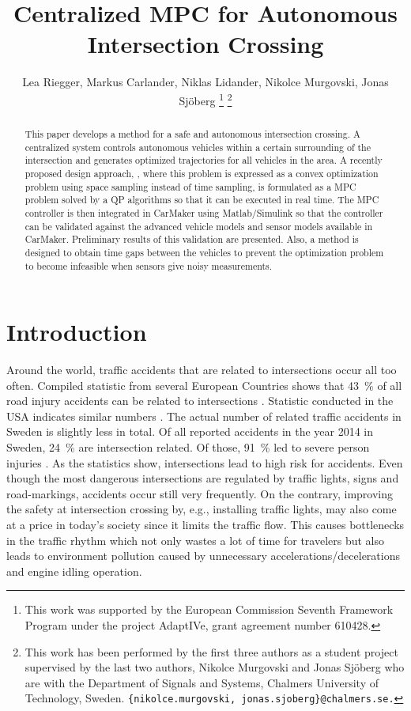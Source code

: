 \documentclass[letterpaper,10pt,conference]{ieeeconf}
\author{Lea Riegger, Markus Carlander, Niklas Lidander, Nikolce Murgovski, Jonas Sj\"oberg
\thanks{This work was supported by the European Commission Seventh Framework
Program under the project AdaptIVe, grant agreement number 610428.}
\thanks{This work has been performed by the first three authors as a
  student project supervised by the last two authors, Nikolce Murgovski
  and Jonas Sj\"oberg who are with the Department of Signals and Systems, Chalmers University of Technology, Sweden. {\tt \{nikolce.murgovski, jonas.sjoberg\}@chalmers.se.}}}%
\begin{document}
\title{Centralized MPC for Autonomous Intersection Crossing}

\maketitle
\thispagestyle{empty}
\pagestyle{empty}

\begin{abstract}
This paper develops a method for a safe and autonomous intersection
crossing. A centralized system controls autonomous vehicles within a
certain surrounding of the intersection and generates optimized
trajectories for all vehicles in the area. A recently proposed design
approach, \cite{nikolce},
where this problem is expressed as a convex optimization problem using
space sampling instead of time sampling, is formulated as a MPC
problem solved by a QP algorithms so that it can be executed in real time.
The MPC controller is then integrated in CarMaker using
Matlab/Simulink so that the controller can be validated against the
advanced vehicle models and sensor models available in
CarMaker. Preliminary results of this validation are presented. Also, a
method is designed to obtain time gaps between the vehicles to prevent the
optimization problem to become infeasible when sensors give noisy measurements.
\end{abstract}

\IEEEpeerreviewmaketitle

\section{Introduction}%

Around the world, traffic accidents that are related to intersections occur all too often. Compiled statistic from several European Countries shows that \SI{43}{\%} of all road injury accidents can be related to intersections \cite{molinero}. Statistic conducted in the USA indicates similar numbers \cite{nhtsa}. The actual number of related traffic accidents in Sweden is slightly less in total. Of all reported accidents in the year 2014 in Sweden, \SI{24}{\%} are intersection related. Of those, \SI{91}{\%} led to severe person injuries \cite{sverige}. As the statistics show, intersections lead to high risk for accidents. Even though the most dangerous intersections are regulated by traffic lights, signs and road-markings, accidents occur still very frequently. On the contrary, improving the safety at intersection crossing by, e.g., installing traffic lights, may also come at a price in today's society since it limits the traffic flow. This causes bottlenecks in the traffic rhythm which not only wastes a lot of time for travelers but also leads to environment pollution caused by unnecessary accelerations/decelerations and engine idling operation.
\end{document}
